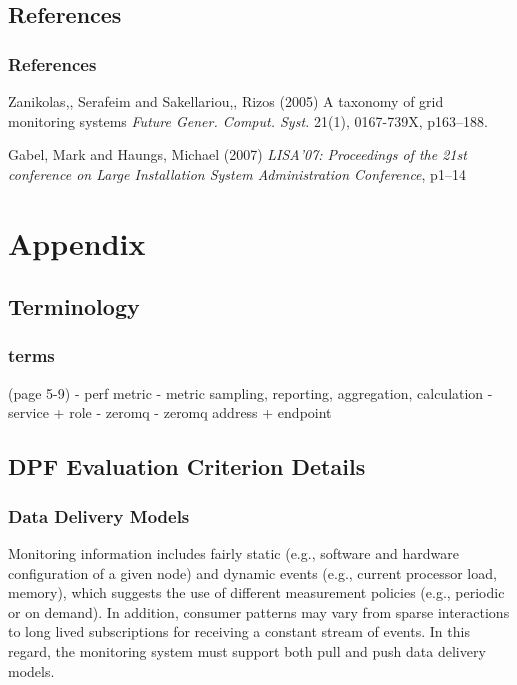 \documentclass{beamer}
\renewcommand\appendixname{Appendix}
\begin{document}
\subsection{References}
\begin{frame}
\frametitle{References}
\footnotesize{
\begin{thebibliography}{99} %

 {Zanikolas,, Serafeim and Sakellariou,, Rizos} (2005)
\newblock A taxonomy of grid monitoring systems
\newblock \emph{Future Gener. Comput. Syst.} 21(1), 0167-739X, p163--188.

 {Gabel, Mark and Haungs, Michael} (2007)
\newblock \emph{LISA'07: Proceedings of the 21st conference on Large Installation System Administration Conference}, p1--14

\end{thebibliography}
}
\end{frame}


\appendix

\section{\appendixname}
\frame{\tableofcontents}

\subsection{Terminology}
\begin{frame}
\frametitle{terms}
(page 5-9)
-   perf metric
-   metric sampling, reporting, aggregation, calculation
-   service + role
-   zeromq
-   zeromq address + endpoint
\end{frame}

\subsection{DPF Evaluation Criterion Details}

\begin{frame}
\frametitle{Data Delivery Models}
Monitoring information includes fairly static (e.g., software and hardware configuration of a given node) and dynamic
events (e.g., current processor load, memory), which suggests the use of different measurement policies (e.g., periodic
or on demand). In addition, consumer patterns may vary from sparse interactions to long lived subscriptions for
receiving a constant stream of events. In this regard, the monitoring system must support both pull and push data
delivery models.
\end{frame}
\end{document}
